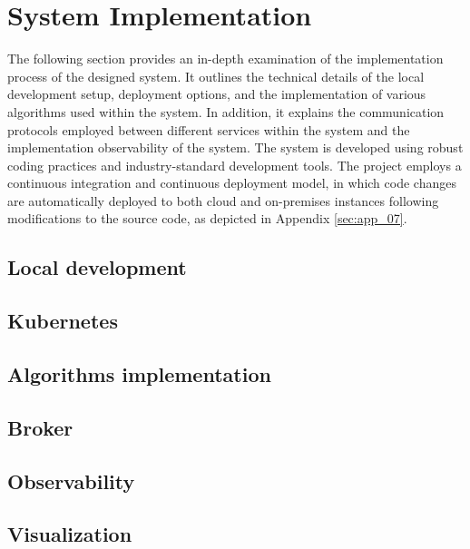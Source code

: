 \chapter{System Implementation}
The following section provides an in-depth examination of the implementation process of the designed system. It outlines the technical details of the local development setup, deployment options, and the implementation of various algorithms used within the system. In addition, it explains the communication protocols employed between different services within the system and the implementation observability of the system. The system is developed using robust coding practices and industry-standard development tools. The project employs a continuous integration and continuous deployment model, in which code changes are automatically deployed to both cloud and on-premises instances following modifications to the source code, as depicted in Appendix \ref{sec:app_07}.

\section{Local development}


\section{Kubernetes}


\section{Algorithms implementation}


\section{Broker}


\section{Observability}
\label{sec:04_06_observability}


\section{Visualization}

